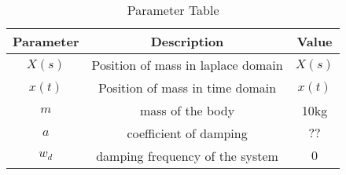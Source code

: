 \begin{table}[H]
    \center
    \renewcommand\thetable{1}
 

\def\arraystretch{3}
\begin{adjustbox}{width=0.5\textwidth}
    \begin{tabular}{|c|c|c|}
    \hline
        \textbf{Parameter}&\textbf{Description}&\textbf{Value}\\
        \hline
        $X(s)$&Position of mass in laplace domain&$X(s)$\\
        \hline
        $x(t)$&Position of mass in time domain&$x(t)$ \\
        \hline
        $m$ &mass of the body&10kg \\
        \hline
        $a$&coefficient of damping &$??$ \\
        \hline
        $w_d$&damping frequency of the system&$0$ \\
        \hline
       \end{tabular} 
            \end{adjustbox}
    \caption{Parameter Table}

    \label{tab:2021ae19}
\end{table}
